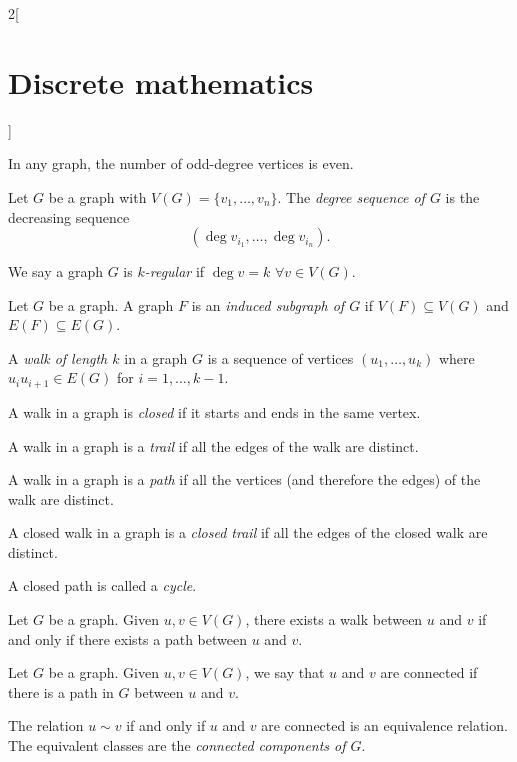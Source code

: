 \documentclass[../../../main.tex]{subfiles}
\begin{document}
\begin{multicols}{2}[\section{Discrete mathematics}]
\begin{corollary}
In any graph, the number of odd-degree vertices is even.
\end{corollary}
\begin{definition}
Let $G$ be a graph with $V(G)=\{v_1,\ldots,v_n\}$. The \textit{degree sequence of $G$} is the decreasing sequence $$(\deg v_{i_1},\ldots,\deg v_{i_n}).$$
\end{definition}
\begin{definition}
We say a graph $G$ is \textit{$k$-regular} if $\deg v=k$ $\forall v\in V(G)$.
\end{definition}
\begin{definition}
Let $G$ be a graph. A graph $F$ is an \textit{induced subgraph of $G$} if $V(F)\subseteq V(G)$ and $E(F)\subseteq E(G)$.
\end{definition}
\begin{definition}
A \textit{walk of length $k$} in a graph $G$ is a sequence of vertices $(u_1,\ldots,u_k)$ where $u_iu_{i+1}\in E(G)$ for $i=1,\ldots,k-1$.
\end{definition}
\begin{definition}
A walk in a graph is \textit{closed} if it starts and ends in the same vertex.
\end{definition}
\begin{definition}
A walk in a graph is a \textit{trail} if all the edges of the walk are distinct.
\end{definition}
\begin{definition}
A walk in a graph is a \textit{path} if all the vertices (and therefore the edges) of the walk are distinct.
\end{definition}
\begin{definition}
A closed walk in a graph is a \textit{closed trail} if all the edges of the closed walk are distinct.
\end{definition}
\begin{definition}
A closed path is called a \textit{cycle}.
\end{definition}
\begin{prop}
Let $G$ be a graph. Given $u,v\in V(G)$, there exists a walk between $u$ and $v$ if and only if there exists a path between $u$ and $v$.
\end{prop}
\begin{definition}
Let $G$ be a graph. Given $u,v\in V(G)$, we say that $u$ and $v$ are connected if there is a path in $G$ between $u$ and $v$.
\end{definition}
\begin{prop}
The relation $u\sim v$ if and only if $u$ and $v$ are connected is an equivalence relation. The equivalent classes are the \textit{connected components of $G$}.

\end{prop}
\end{multicols}
\end{document}
